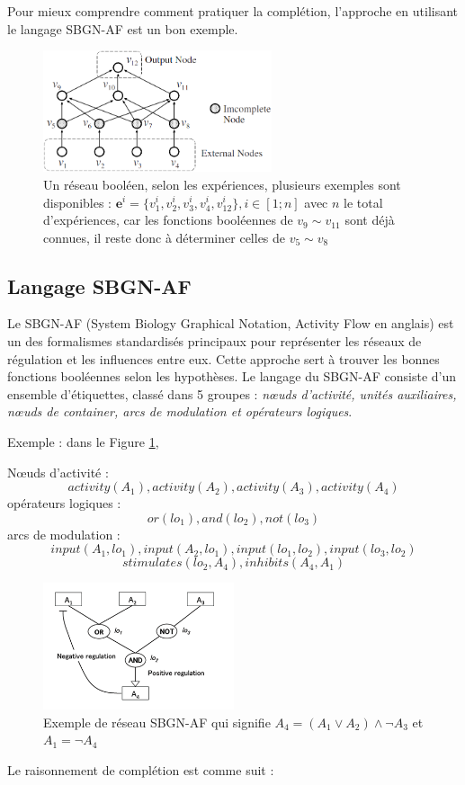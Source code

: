 \documentclass[11pt]{report}
\theoremstyle{definition}
\begin{document}
Pour mieux comprendre comment pratiquer la compl\'etion, l'approche en utilisant le langage SBGN-AF est un bon exemple.
\begin{figure}
\centering
\includegraphics[width=0.6\textwidth]{Boolean.png}
\caption{Un r\'eseau bool\'een, selon les exp\'eriences, plusieurs exemples sont disponibles : $\mathbf{e}^i=\{v_1^i,v_2^i,v_3^i,v_4^i,v_{12}^i\}, i\in[1;n]$ avec $n$ le total d'exp\'eriences, car les fonctions bool\'eennes de $v_9\sim v_{11}$ sont d\'ej\`a connues, il reste donc \`a d\'eterminer celles de $v_5\sim v_8$}
\end{figure}
\subsection{Langage SBGN-AF}
Le SBGN-AF (System Biology Graphical Notation, Activity Flow en anglais) est un des formalismes standardis\'es principaux pour repr\'esenter les r\'eseaux de r\'egulation et les influences entre eux. Cette approche sert \`a trouver les bonnes fonctions bool\'eennes selon les hypoth\`eses. Le langage du SBGN-AF consiste d'un ensemble d'\'etiquettes, class\'e dans 5 groupes : \textit{n\oe uds d'activit\'e, unit\'es auxiliaires, n\oe uds de container, arcs de modulation et op\'erateurs logiques}.

Exemple : dans le Figure \ref{fig1},

N\oe uds d'activit\'e : $$activity(A_1), activity(A_2), activity(A_3), activity(A_4)$$
op\'erateurs logiques : $$or(lo_1), and(lo_2), not(lo_3)$$
arcs de modulation : $$input(A_1,lo_1), input(A_2, lo_1), input(lo_1,lo_2), input(lo_3, lo_2)$$
$$ stimulates(lo_2, A_4), inhibits(A_4, A_1)$$

\begin{figure}[ht]
\centering
\includegraphics[width=0.5\textwidth]{SBGN-AF.png}
\caption{Exemple de r\'eseau SBGN-AF qui signifie $A_4=(A_1\lor A_2)\land\lnot A_3$ et $A_1=\lnot A_4$}
\label{fig1}
\end{figure}
Le raisonnement de compl\'etion est comme suit : 
\end{document}
